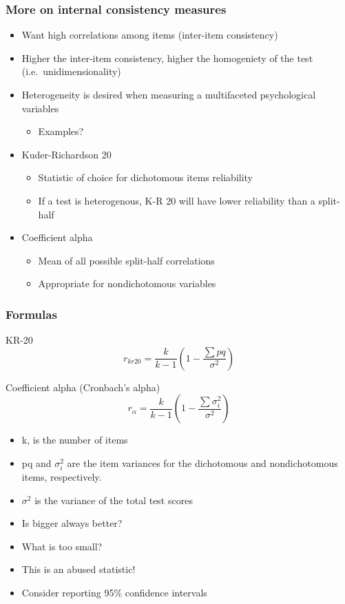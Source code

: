 \documentclass[dvipsnames]{beamer}\usepackage[]{graphicx}\usepackage[]{color}
\begin{document}
\begin{frame}
\frametitle{More on internal consistency measures}
  \begin{itemize}
  \item Want high correlations among items (\textcolor{wared}{inter-item consistency})
  \item Higher the inter-item consistency, higher the \textcolor{wared}{homogeniety} of the test (i.e.\ unidimensionality)
  \item Heterogeneity is desired when measuring a multifaceted psychological variables
    \begin{itemize}
      \item Examples?
    \end{itemize}
    \item \textcolor{wared}{Kuder-Richardson 20} 
      \begin{itemize}
        \item Statistic of choice for dichotomous items reliability
        \item If a test is heterogenous, K-R 20 will have lower reliability than a split-half
      \end{itemize}
      \item \textcolor{wared}{Coefficient alpha}
        \begin{itemize}
          \item Mean of all possible split-half correlations
          \item Appropriate for nondichotomous variables
        \end{itemize}
  \end{itemize}
\end{frame}

\begin{frame}
\frametitle{Formulas}
\centering \textcolor{wapurple}{KR-20}
$$r_{kr20} = \frac{k}{k - 1}\left(1 - \frac{\sum pq}{\sigma^2}\right)$$


\centering \textcolor{wapurple}{Coefficient alpha (Cronbach's alpha)}
$$r_{\alpha} = \frac{k}{k - 1}\left(1 - \frac{\sum \sigma^2_i}{\sigma^2}\right)$$

\begin{itemize}
  \item k, is the number of items
  \item pq and $\sigma^2_i$ are the item variances for the dichotomous and nondichotomous items, respectively.
  \item $\sigma^2$ is the variance of the total test scores
  \item<2-> \textcolor{wapurple}{Is bigger always better?}
  \item<3-> \textcolor{wapurple}{What is too small?}
  \item<4-> \textcolor{wared}{This is an abused statistic!}
  \item<4-> \textcolor{wared}{Consider reporting 95\% confidence intervals}
\end{itemize}
\end{frame}
\end{document}
